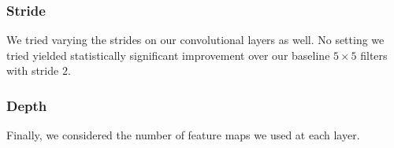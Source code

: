 \documentclass{article}
\begin{document}
\begin{multicols}{2}
\subsubsection{Stride}

We tried varying the strides on our convolutional layers as well.
No setting we tried yielded statistically significant improvement
over our baseline $5\times 5$ filters with stride $2$.


\subsubsection{Depth}

Finally, we considered the number of feature maps
we used at each layer.













\end{multicols}
\end{document}
